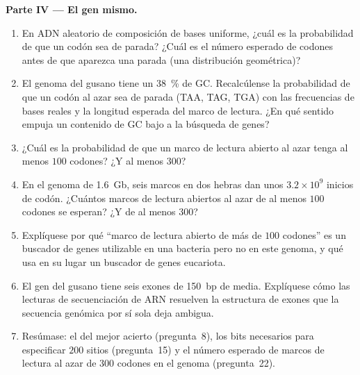 \begin{problem}
\medskip
\noindent\textbf{Parte IV --- El gen mismo.}
\begin{enumerate}[resume]
  \item En ADN aleatorio de composición de bases uniforme, ¿cuál es la
        probabilidad de que un codón sea de parada? ¿Cuál es el número
        esperado de codones antes de que aparezca una parada (una
        distribución geométrica)?
  \item El genoma del gusano tiene un \qty{38}{\%} de GC. Recalcúlense
        la probabilidad de que un codón al azar sea de parada (TAA, TAG,
        TGA) con las frecuencias de bases reales y la longitud esperada
        del marco de lectura. ¿En qué sentido empuja un contenido de GC
        bajo a la búsqueda de genes?
  \item ¿Cuál es la probabilidad de que un marco de lectura abierto al
        azar tenga al menos $100$ codones? ¿Y al menos $300$?
  \item En el genoma de \qty{1.6}{Gb}, seis marcos en dos hebras dan
        unos $3.2\times 10^{9}$ inicios de codón. ¿Cuántos marcos de
        lectura abiertos al azar de al menos $100$ codones se esperan?
        ¿Y de al menos $300$?
  \item Explíquese por qué ``marco de lectura abierto de más de $100$
        codones'' es un buscador de genes utilizable en una bacteria
        pero no en este genoma, y qué usa en su lugar un buscador de
        genes eucariota.
  \item El gen del gusano tiene seis exones de \qty{150}{bp} de media.
        Explíquese cómo las lecturas de secuenciación de ARN resuelven
        la estructura de exones que la secuencia genómica por sí sola
        deja ambigua.
  \item Resúmase: el  del mejor acierto (pregunta~8), los bits
        necesarios para especificar $200$ sitios (pregunta~15) y el
        número esperado de marcos de lectura al azar de $300$ codones en
        el genoma (pregunta~22).
\end{enumerate}
\end{problem}
